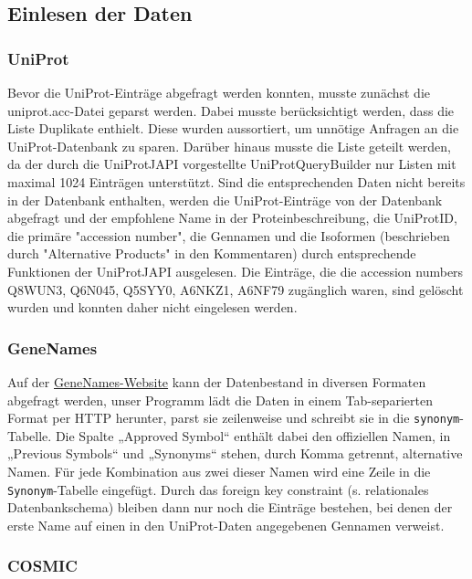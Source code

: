 \documentclass{scrartcl}
\begin{document}
\subsection{Einlesen der Daten}

\subsubsection{UniProt}

Bevor die UniProt-Einträge abgefragt werden konnten, musste zunächst die uniprot.acc-Datei geparst werden. Dabei musste berücksichtigt werden, dass die Liste Duplikate enthielt. Diese wurden aussortiert, um unnötige Anfragen an die UniProt-Datenbank zu sparen.
   Darüber hinaus musste die Liste geteilt werden, da der durch die UniProtJAPI vorgestellte UniProtQueryBuilder nur Listen mit maximal 1024 Einträgen unterstützt. Sind die entsprechenden Daten nicht bereits in der Datenbank enthalten, werden die UniProt-Einträge von der Datenbank abgefragt und der empfohlene Name in der Proteinbeschreibung, die UniProtID, die primäre "accession number", die Gennamen und die Isoformen (beschrieben durch "Alternative Products" in den Kommentaren) durch entsprechende Funktionen der UniProtJAPI ausgelesen.
   Die Einträge, die die accession numbers Q8WUN3, Q6N045, Q5SYY0, A6NKZ1, A6NF79 zugänglich waren, sind gelöscht wurden und konnten daher nicht eingelesen werden.

\subsubsection{GeneNames}

Auf der \href{http://genenames.org/}{GeneNames-Website} kann der Datenbestand in diversen Formaten abgefragt werden, unser Programm lädt die Daten in einem Tab-separierten Format per HTTP herunter, parst sie zeilenweise und schreibt sie in die \texttt{synonym}-Tabelle. Die Spalte „Approved Symbol“ enthält dabei den offiziellen Namen, in „Previous Symbols“ und „Synonyms“ stehen, durch Komma getrennt, alternative Namen. Für jede Kombination aus zwei dieser Namen wird eine Zeile in die \texttt{Synonym}-Tabelle eingefügt. Durch das foreign key constraint (s. relationales Datenbankschema) bleiben dann nur noch die Einträge bestehen, bei denen der erste Name auf einen in den UniProt-Daten angegebenen Gennamen verweist.

\subsubsection{COSMIC}
\end{document}
